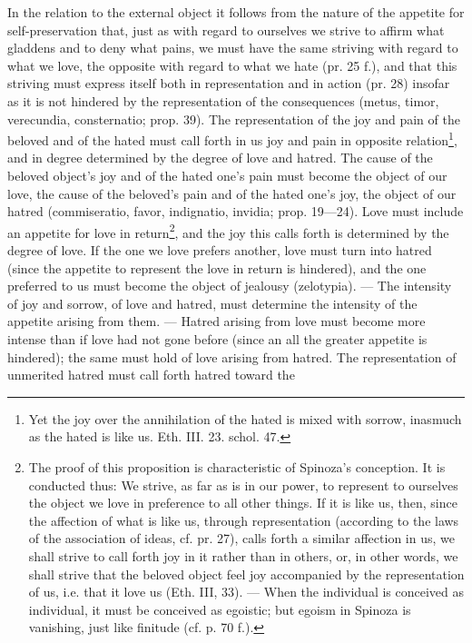 \documentclass[12pt,a4paper,openany]{book}
\newcommand{\opage}[1]{\marginnote{\footnotesize\textit{[#1]}}}
\begin{document}
In the relation to the external object it follows from the nature of the appetite
for self-preservation that, just as with regard
to ourselves we strive to affirm what gladdens and to deny
what pains, we must have the same striving with regard
to what we love, the opposite with regard to what
we hate (pr. 25 f.), and that this striving must express itself
both in representation and in action (pr. 28) insofar as it is not
hindered by the representation of the consequences (metus, timor, verecundia,
consternatio; prop. 39). The representation of the
joy and pain of the beloved and of the hated must call forth in us
joy and pain in opposite
relation\footnote{Yet the joy over the annihilation of the hated
is mixed with sorrow, inasmuch as the hated is
like us. Eth. III. 23. schol. 47.}, and in
degree determined by the degree of love and hatred. The cause
of the beloved object's joy and of the hated one's
pain must become the object of our love, the cause
of the beloved's pain and of the hated one's joy, the object of our
hatred (commiseratio, favor, indignatio, invidia; prop. 19---24).
Love must include an appetite for
love in return\footnote{The proof of this proposition is
characteristic of Spinoza's conception. It is conducted thus:
We strive, as far as is in our power, to represent to ourselves the
object we love in preference to all other things. If it is like
us, then, since the affection of what is like us, through
representation (according to the laws of the association of ideas, cf. pr. 27),
calls forth a similar affection in us, we shall strive to
call forth joy in it rather than in others, or, in other
words, we shall strive that the beloved object feel
joy accompanied by the representation of us, i.e. that it love us
(Eth. III, 33). --- When the individual is conceived as individual, it must
be conceived as egoistic; but egoism in Spinoza is
vanishing, just like finitude (cf. p. 70 f.).}, and
the joy this calls forth is determined by the degree of
love. If the one we love prefers another,
\opage{117}\setcounter{footnote}{0}love must turn into hatred (since the appetite to represent the love in return
is hindered), and the one preferred to us must become
the object of jealousy (zelotypia). --- The intensity of joy and sorrow,
of love and hatred, must determine the intensity of the appetite
arising from them. --- Hatred arising from love
must become more intense than if love had not
gone before (since an all the greater appetite is hindered); the
same must hold of love arising from hatred. The representation
of unmerited hatred must call forth hatred toward the
\end{document}
